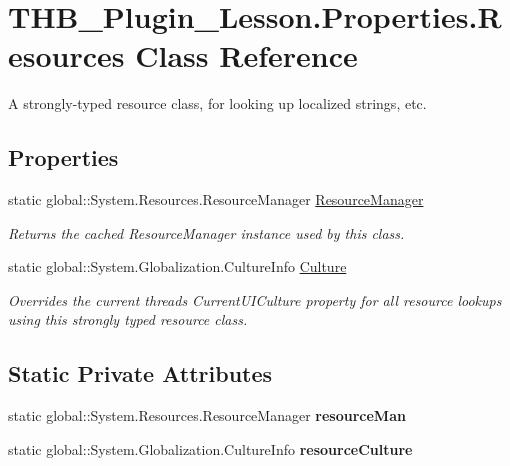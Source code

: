 \hypertarget{class_t_h_b___plugin___lesson_1_1_properties_1_1_resources}{}\section{T\+H\+B\+\_\+\+Plugin\+\_\+\+Lesson.\+Properties.\+Resources Class Reference}
\label{class_t_h_b___plugin___lesson_1_1_properties_1_1_resources}


A strongly-\/typed resource class, for looking up localized strings, etc.  


\subsection*{Properties}
\begin{DoxyCompactItemize}
\item 
static global\+::\+System.\+Resources.\+Resource\+Manager \mbox{\hyperlink{class_t_h_b___plugin___lesson_1_1_properties_1_1_resources_ab650796d55ba8c122c31df39d29ad3fd}{Resource\+Manager}}
\begin{DoxyCompactList}\small\item\em Returns the cached Resource\+Manager instance used by this class. \end{DoxyCompactList}\item 
static global\+::\+System.\+Globalization.\+Culture\+Info \mbox{\hyperlink{class_t_h_b___plugin___lesson_1_1_properties_1_1_resources_a4cbee6fc062dab9463a53238fa76b2d0}{Culture}}
\begin{DoxyCompactList}\small\item\em Overrides the current thread\textquotesingle{}s Current\+U\+I\+Culture property for all resource lookups using this strongly typed resource class. \end{DoxyCompactList}\end{DoxyCompactItemize}
\subsection*{Static Private Attributes}
\begin{DoxyCompactItemize}
\item 
\mbox{\label{class_t_h_b___plugin___lesson_1_1_properties_1_1_resources_ac08be1ba22be5a78c1903fab9ef4b4af}} 
static global\+::\+System.\+Resources.\+Resource\+Manager {\bfseries resource\+Man}
\item 
\mbox{\label{class_t_h_b___plugin___lesson_1_1_properties_1_1_resources_a29a2a9097a78f29d618c016e63457df7}} 
static global\+::\+System.\+Globalization.\+Culture\+Info {\bfseries resource\+Culture}
\end{DoxyCompactItemize}


